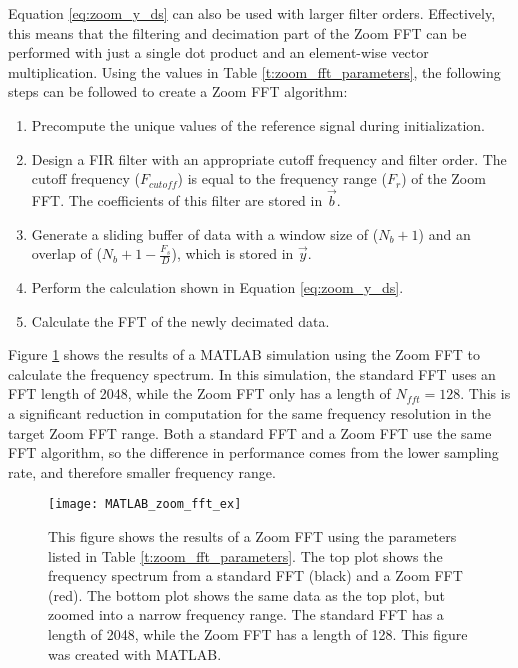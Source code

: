 Equation \ref{eq:zoom_y_ds} can also be used with larger filter orders.  Effectively, this means that the filtering and decimation part of the Zoom FFT can be performed with just a single dot product and an element-wise vector multiplication.  Using the values in Table \ref{t:zoom_fft_parameters}, the following steps can be followed to create a Zoom FFT algorithm:
\begin{enumerate}
	\item Precompute the unique values of the reference signal during initialization.
	\item Design a FIR filter with an appropriate cutoff frequency and filter order.  The cutoff frequency ($F_{cutoff}$) is equal to the frequency range ($F_r$) of the Zoom FFT.  The coefficients of this filter are stored in $\vec{b}$.
	\item Generate a sliding buffer of data with a window size of ($N_b+1$) and an overlap of ($N_b+1 - \frac{F_s}{D}$), which is stored in $\vec{y}$.
	\item Perform the calculation shown in Equation \ref{eq:zoom_y_ds}.
	\item Calculate the FFT of the newly decimated data.
\end{enumerate}

Figure \ref{fig:MATLAB_zoom_fft_ex} shows the results of a MATLAB simulation using the Zoom FFT to calculate the frequency spectrum.  In this simulation, the standard FFT uses an FFT length of 2048, while the Zoom FFT only has a length of $N_{fft}=128$.  This is a significant reduction in computation for the same frequency resolution in the target Zoom FFT range.  Both a standard FFT and a Zoom FFT use the same FFT algorithm, so the difference in performance comes from the lower sampling rate, and therefore smaller frequency range.

\begin{figure}
	\centering
	\texttt{[image: MATLAB\_zoom\_fft\_ex]}
	\decoRule
	\caption{This figure shows the results of a Zoom FFT using the parameters listed in Table \ref{t:zoom_fft_parameters}.  The top plot shows the frequency spectrum from a standard FFT (black) and a Zoom FFT (red).  The bottom plot shows the same data as the top plot, but zoomed into a narrow frequency range. The standard FFT has a length of 2048, while the Zoom FFT has a length of 128.  This figure was created with MATLAB.}
	\label{fig:MATLAB_zoom_fft_ex}
\end{figure}

